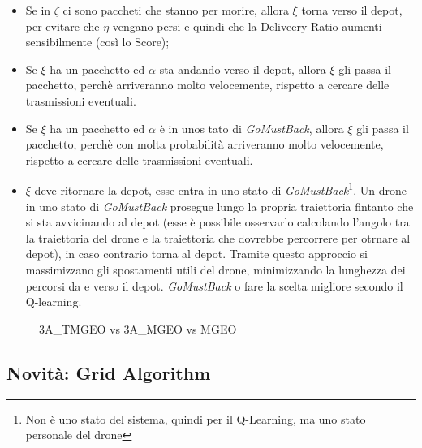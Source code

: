 \documentclass[12pt]{article}
\begin{document}
\begin{itemize}

    \item Se in $\zeta$ ci sono paccheti che stanno per morire, allora $\xi$ torna verso il depot, per evitare che $\eta$ vengano persi e quindi che la Deliveery Ratio aumenti sensibilmente (così lo Score);

    \item Se $\xi$ ha un pacchetto ed $\alpha$ sta andando verso il depot, allora $\xi$ gli passa il pacchetto, perchè arriveranno molto velocemente, rispetto a cercare delle trasmissioni eventuali.
    
    \item  Se $\xi$ ha un pacchetto ed $\alpha$ è in unos tato di \textit{GoMustBack}, allora $\xi$ gli passa il pacchetto, perchè con molta probabilità arriveranno molto velocemente, rispetto a cercare delle trasmissioni eventuali.
    
    \item $\xi$ deve ritornare la depot, esse entra in uno stato di \textit{GoMustBack}\footnote{Non è uno stato del sistema, quindi per il Q-Learning, ma uno stato personale del drone}.
    Un drone in uno stato di \textit{GoMustBack} prosegue lungo la propria traiettoria fintanto che si sta avvicinando al depot (esse è possibile osservarlo calcolando l'angolo tra la traiettoria del drone e la traiettoria che dovrebbe percorrere per otrnare al depot), in caso contrario torna al depot. Tramite questo approccio si massimizzano gli spostamenti utili del drone, minimizzando la lunghezza dei percorsi da e verso il depot.
 \textit{GoMustBack} o fare la scelta migliore secondo il Q-learning.
    
\end{itemize}

\begin{figure}[H]
    
    \qquad
    \caption{3A\_TMGEO vs 3A\_MGEO vs MGEO}%
    \label{fig:example}%
\end{figure}


\subsection{Novità: Grid Algorithm}
\end{document}

